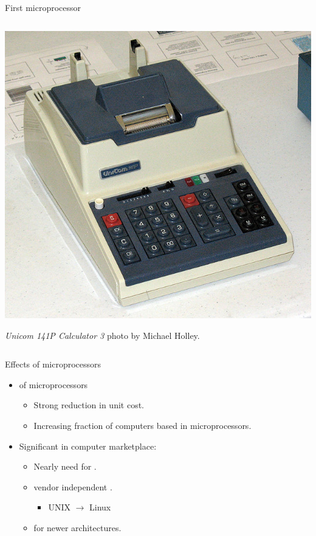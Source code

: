 \begin{frame}[t]{First microprocessor}
\begin{columns}[T]
\begin{column}{.3\textwidth}
\begin{tiny}
    \end{tiny}
    \vspace{1em}
    \includegraphics[width=.5\textwidth]{images/i4004-calculator.jpg}\\
    \begin{tiny}
      \emph{Unicom 141P Calculator 3} photo by Michael Holley.\\ 
    \end{tiny}
  \end{column}
\end{columns}
\end{frame}

\begin{frame}[t]{Effects of microprocessors}
\begin{itemize}
  \item {} of microprocessors
    \begin{itemize}
      \item Strong reduction in unit cost.
      \item Increasing fraction of computers based in microprocessors.
    \end{itemize}

  \item Significant  in computer marketplace:
    \begin{itemize}
      \item Nearly  need for .
      \item {} vendor independent .
        \begin{itemize}
          \item UNIX $\rightarrow$ Linux
        \end{itemize}
      \item {} for newer architectures.
    \end{itemize}
\end{itemize}
\end{frame}

